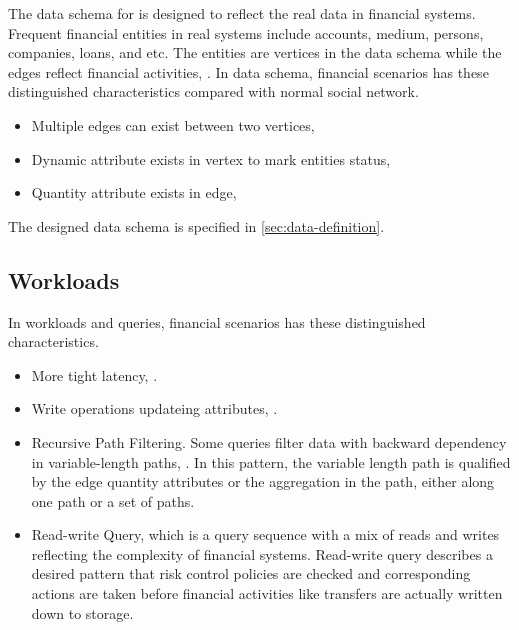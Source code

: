 The data schema for \ldbcfinbench is designed to reflect the real data in financial systems. Frequent
financial entities in real systems include accounts, medium, persons, companies, loans, and etc. The
entities are vertices in the data schema while the edges reflect financial activities, . In data schema, financial scenarios has these distinguished characteristics
compared with normal social network.
\begin{itemize}
    \item Multiple edges can exist between two vertices, 
    \item Dynamic attribute exists in vertex to mark entities status, 
    \item Quantity attribute exists in edge, 
\end{itemize}

The designed data schema is specified in \autoref{sec:data-definition}.

\subsection{Workloads}

In workloads and queries, financial scenarios has these distinguished characteristics.
\begin{itemize}
    \item More tight latency, .
    \item Write operations updateing attributes, .
    \item Recursive Path Filtering. Some queries filter data with backward dependency
    in variable-length paths, . In this pattern, the variable length path is qualified by
    the edge quantity attributes or the aggregation in the path, either along one path
    or a set of paths.
    \item Read-write Query, which is a query sequence with a mix of reads and writes reflecting the
    complexity of financial systems. Read-write query describes a desired pattern that risk control
    policies are checked and corresponding actions are taken before financial activities like
    transfers are actually written down to storage.
\end{itemize}

